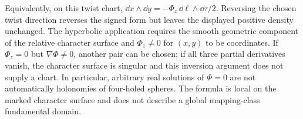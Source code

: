 Equivalently, on this twist chart,
$\dd x\wedge\dd y=-\Phi_z\,\dd\ell\wedge\dd\tau/2$.
Reversing the chosen twist direction reverses the signed form but leaves
the displayed positive density unchanged. The hyperbolic application
requires the smooth geometric component of the relative character
surface and $\Phi_z\ne0$ for $(x,y)$ to be coordinates. If $\Phi_z=0$
but $\nabla\Phi\ne0$, another pair can be chosen; if all three partial
derivatives vanish, the character surface is singular and this inversion
argument does not supply a chart. In particular, arbitrary real solutions
of $\Phi=0$ are not automatically holonomies of four-holed spheres.
The formula is local on the marked character surface and does not
describe a global mapping-class fundamental domain.

